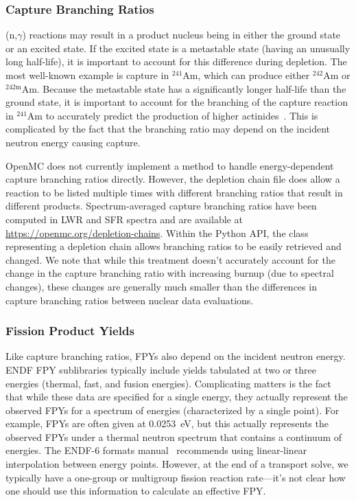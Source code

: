 \documentclass[3p,authoryear]{elsarticle}
\begin{document}
\subsubsection{Capture Branching Ratios}

(n,$\gamma$) reactions may result in a product nucleus being in either the
ground state or an excited state. If the excited state is a metastable state
(having an unusually long half-life), it is important to account for this
difference during depletion. The most well-known example is capture in
$^{241}$Am, which can produce either $^{242}$Am or $^{242\text{m}}$Am. Because the
metastable state has a significantly longer half-life than the ground state, it
is important to account for the branching of the capture reaction in $^{241}$Am
to accurately predict the production of higher actinides~\citep{haeck2012nse}.
This is complicated by the fact that the branching ratio may depend on the
incident neutron energy causing capture.

OpenMC does not currently implement a method to handle energy-dependent capture
branching ratios directly. However, the depletion chain file does allow a
reaction to be listed multiple times with different branching ratios that result
in different products. Spectrum-averaged capture branching ratios have been
computed in LWR and SFR spectra and are available at
\url{https://openmc.org/depletion-chains}. Within the Python API, the class
representing a depletion chain allows branching ratios to be easily retrieved
and changed. We note that while this treatment doesn't accurately account for
the change in the capture branching ratio with increasing burnup (due to
spectral changes), these changes are generally much smaller than the differences
in capture branching ratios between nuclear data evaluations.

\subsubsection{Fission Product Yields}
\label{sec:fpy}

Like capture branching ratios, FPYs also depend on the incident neutron energy.
ENDF FPY sublibraries typically include yields tabulated at two or three
energies (thermal, fast, and fusion energies). Complicating matters is the fact
that while these data are specified for a single energy, they actually represent
the observed FPYs for a spectrum of energies (characterized by a single point).
For example, FPYs are often given at \SI{0.0253}{\electronvolt}, but this
actually represents the observed FPYs under a thermal neutron spectrum that
contains a continuum of energies. The ENDF-6 formats manual~\citep{trkov2018bnl}
recommends using linear-linear interpolation between energy points. However, at
the end of a transport solve, we typically have a one-group or multigroup
fission reaction rate---it's not clear how one should use this information to
calculate an effective FPY.
\end{document}

